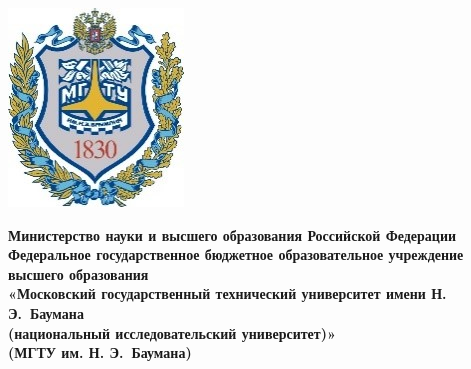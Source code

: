 \newcommand{\fixunderline}[3]
{
	$\underset{\text{#3}}{\text{\uline{\stackengine{0pt}{\hspace{#2}}{\text{#1}}{O}{c}{F}{F}{L}}}}$
}

\begin{titlepage}
	\fontsize{12pt}{12pt}\selectfont
	\noindent \begin{minipage}{0.15\textwidth}
		\includegraphics[width=\linewidth]{img/b_logo.jpg}
	\end{minipage}
	\noindent\begin{minipage}{0.9\textwidth}\centering
		\textbf{Министерство науки и высшего образования Российской Федерации}\\
		\textbf{Федеральное государственное бюджетное образовательное учреждение высшего образования}\\
		\textbf{«Московский государственный технический университет имени Н. Э.~Баумана}\\
		\textbf{(национальный исследовательский университет)»}\\
		\textbf{(МГТУ им. Н. Э.~Баумана)}
	\end{minipage}
	

\end{titlepage}
